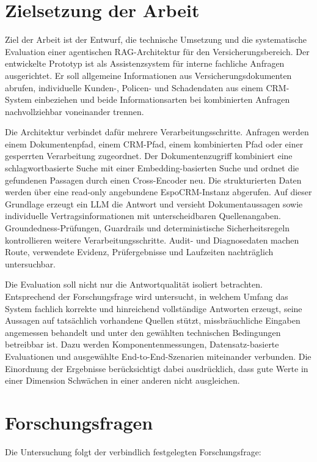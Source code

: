 \section{Zielsetzung der Arbeit}

Ziel der Arbeit ist der Entwurf, die technische Umsetzung und die systematische Evaluation einer agentischen RAG-Architektur für den Versicherungsbereich. Der entwickelte Prototyp ist als Assistenzsystem für interne fachliche Anfragen ausgerichtet. Er soll allgemeine Informationen aus Versicherungsdokumenten abrufen, individuelle Kunden-, Policen- und Schadendaten aus einem CRM-System einbeziehen und beide Informationsarten bei kombinierten Anfragen nachvollziehbar voneinander trennen.

Die Architektur verbindet dafür mehrere Verarbeitungsschritte. Anfragen werden einem Dokumentenpfad, einem CRM-Pfad, einem kombinierten Pfad oder einer gesperrten Verarbeitung zugeordnet. Der Dokumentenzugriff kombiniert eine schlagwortbasierte Suche mit einer Embedding-basierten Suche und ordnet die gefundenen Passagen durch einen Cross-Encoder neu. Die strukturierten Daten werden über eine read-only angebundene EspoCRM-Instanz abgerufen. Auf dieser Grundlage erzeugt ein LLM die Antwort und versieht Dokumentaussagen sowie individuelle Vertragsinformationen mit unterscheidbaren Quellenangaben. Groundedness-Prüfungen, Guardrails und deterministische Sicherheitsregeln kontrollieren weitere Verarbeitungsschritte. Audit- und Diagnosedaten machen Route, verwendete Evidenz, Prüfergebnisse und Laufzeiten nachträglich untersuchbar.

Die Evaluation soll nicht nur die Antwortqualität isoliert betrachten. Entsprechend der Forschungsfrage wird untersucht, in welchem Umfang das System fachlich korrekte und hinreichend vollständige Antworten erzeugt, seine Aussagen auf tatsächlich vorhandene Quellen stützt, missbräuchliche Eingaben angemessen behandelt und unter den gewählten technischen Bedingungen betreibbar ist. Dazu werden Komponentenmessungen, Datensatz-basierte Evaluationen und ausgewählte End-to-End-Szenarien miteinander verbunden. Die Einordnung der Ergebnisse berücksichtigt dabei ausdrücklich, dass gute Werte in einer Dimension Schwächen in einer anderen nicht ausgleichen.

\section{Forschungsfragen}

Die Untersuchung folgt der verbindlich festgelegten Forschungsfrage:

